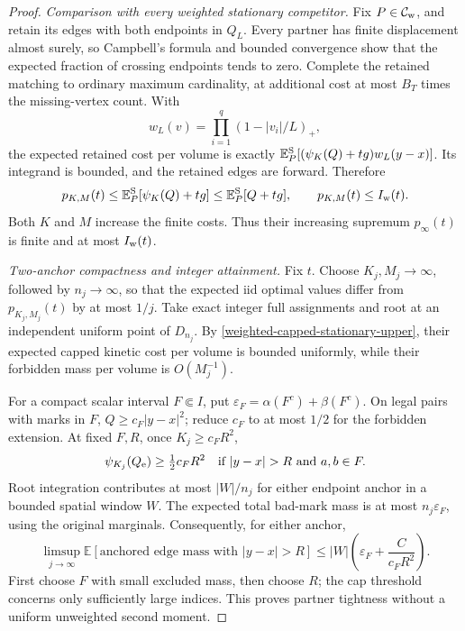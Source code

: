 \documentclass[11pt,reqno]{amsart}
\theoremstyle{definition}
\theoremstyle{remark}
\numberwithin{equation}{section}
\newcommand{\E}{\mathbb E}
\begin{document}
\begin{proof}
\emph{Comparison with every weighted stationary competitor.}
Fix \(P\in\mathcal C_{\rm w}\), and retain its edges with both
endpoints in \(Q_L\). Every partner has finite displacement almost
surely, so Campbell's formula and bounded convergence show that the
expected fraction of crossing endpoints tends to zero. Complete the
retained matching to ordinary maximum cardinality, at additional cost
at most \(B_T\) times the missing-vertex count. With
\[
 w_L(v)=\prod_{i=1}^q(1-|v_i|/L)_+,
\]
the expected retained cost per volume is exactly
\(\E_P^{\rm S}[(\psi_K(Q)+tg)w_L(y-x)]\). Its integrand is
bounded, and the retained edges are forward. Therefore
\begin{equation}
\label{weighted-capped-stationary-upper}
 p_{K,M}(t)\le\E_P^{\rm S}[\psi_K(Q)+tg]
             \le\E_P^{\rm S}[Q+tg],\qquad
 p_{K,M}(t)\le I_{\rm w}(t).
\end{equation}
Both \(K\) and \(M\) increase the finite costs. Thus their
increasing supremum \(p_\infty(t)\) is finite and at most \(I_{\rm w}(t)\).

\emph{Two-anchor compactness and integer attainment.}
Fix \(t\). Choose \(K_j,M_j\to\infty\), followed by
\(n_j\to\infty\), so that the expected iid optimal values differ
from \(p_{K_j,M_j}(t)\) by at most \(1/j\). Take exact integer
full assignments and root at an independent uniform point of \(D_{n_j}\).
By \eqref{weighted-capped-stationary-upper}, their expected capped
kinetic cost per volume is bounded uniformly, while their forbidden
mass per volume is \(O(M_j^{-1})\).

For a compact scalar interval \(F\Subset I\), put
\(\varepsilon_F=\alpha(F^c)+\beta(F^c)\). On legal pairs with
marks in \(F\), \(Q\ge c_F|y-x|^2\); reduce \(c_F\) to at most
\(1/2\) for the forbidden extension. At fixed \(F,R\), once
\(K_j\ge c_FR^2\),
\[
 \psi_{K_j}(Q_{\rm e})\ge\tfrac12c_FR^2
       \quad\text{if }|y-x|>R\text{ and }a,b\in F.
\]
Root integration contributes at most \(|W|/n_j\) for either endpoint
anchor in a bounded spatial window \(W\). The expected total bad-mark
mass is at most \(n_j\varepsilon_F\), using the original marginals.
Consequently, for either anchor,
\begin{equation}
\label{weighted-capped-both-tails}
 \limsup_{j\to\infty}
 \E[\text{anchored edge mass with }|y-x|>R]
       \le |W|\left(\varepsilon_F+\frac{C}{c_FR^2}\right).
\end{equation}
First choose \(F\) with small excluded mass, then choose \(R\);
the cap threshold concerns only sufficiently large indices. This proves
partner tightness without a uniform unweighted second moment.


\end{proof}
\end{document}
